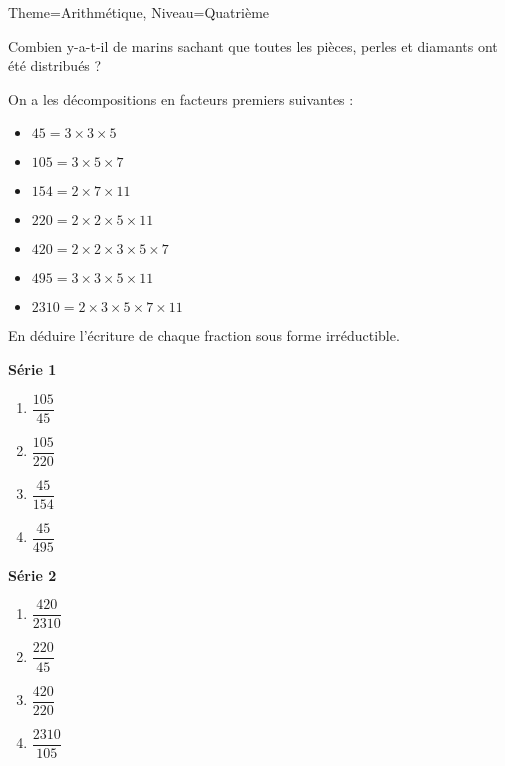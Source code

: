 \documentclass[11pt]{article}
\begin{document}
\begin{multicols}{2}
\begin{Maquette}[Fiche]{Theme=Arithmétique, Niveau=Quatrième}
\begin{exercice}
\begin{enumerate}
    Combien y-a-t-il de marins sachant que toutes les pièces, perles et diamants ont été distribués ?
    \end{enumerate}
\end{exercice}

\columnbreak

 \begin{exercice}
            On a les décompositions en facteurs premiers suivantes :
            \begin{itemize}
                \item $45 = 3 \times 3 \times 5$
                \item $105 = 3 \times 5 \times 7$
                \item $154 = 2 \times 7 \times 11$
                \item $220 = 2 \times 2 \times 5 \times 11$
                \item $420 = 2 \times 2 \times 3 \times 5 \times 7$
                \item $495 = 3 \times 3 \times 5 \times 11$
                \item $2310 = 2 \times 3 \times 5 \times 7 \times 11$
            \end{itemize}
            En déduire l’écriture de chaque fraction sous forme irréductible.
            \begin{multicols}{2}
                \textbf{Série 1}                
                \begin{enumerate}[label=\textbf{\alph*.}]
                    \item $\dfrac{105}{45}$
                    \item $\dfrac{105}{220}$
                    \item $\dfrac{45}{154}$
                    \item $\dfrac{45}{495}$
                \end{enumerate}
                \textbf{Série 2}
                \begin{enumerate}[label=\textbf{\alph*.}]
                    \item $\dfrac{420}{2310}$
                    \item $\dfrac{220}{45}$
                    \item $\dfrac{420}{220}$
                    \item $\dfrac{2310}{105}$
                \end{enumerate}
            \end{multicols}
        \end{exercice}

\end{Maquette}

\end{multicols}
\end{document}

